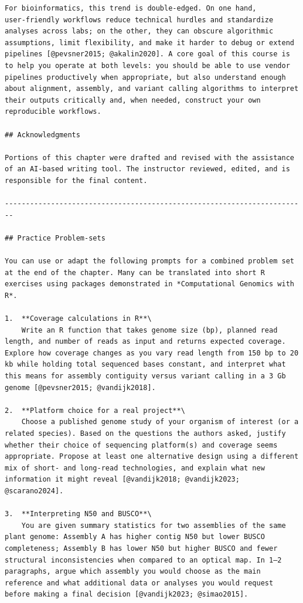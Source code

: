 \documentclass[
  letterpaper,
  DIV=11,
  numbers=noendperiod]{scrreprt}
\begin{document}
\begin{verbatim}
For bioinformatics, this trend is double‑edged. On one hand, user‑friendly workflows reduce technical hurdles and standardize analyses across labs; on the other, they can obscure algorithmic assumptions, limit flexibility, and make it harder to debug or extend pipelines [@pevsner2015; @akalin2020]. A core goal of this course is to help you operate at both levels: you should be able to use vendor pipelines productively when appropriate, but also understand enough about alignment, assembly, and variant calling algorithms to interpret their outputs critically and, when needed, construct your own reproducible workflows.

## Acknowledgments

Portions of this chapter were drafted and revised with the assistance of an AI‑based writing tool. The instructor reviewed, edited, and is responsible for the final content.

------------------------------------------------------------------------

## Practice Problem‑sets

You can use or adapt the following prompts for a combined problem set at the end of the chapter. Many can be translated into short R exercises using packages demonstrated in *Computational Genomics with R*.

1.  **Coverage calculations in R**\
    Write an R function that takes genome size (bp), planned read length, and number of reads as input and returns expected coverage. Explore how coverage changes as you vary read length from 150 bp to 20 kb while holding total sequenced bases constant, and interpret what this means for assembly contiguity versus variant calling in a 3 Gb genome [@pevsner2015; @vandijk2018].

2.  **Platform choice for a real project**\
    Choose a published genome study of your organism of interest (or a related species). Based on the questions the authors asked, justify whether their choice of sequencing platform(s) and coverage seems appropriate. Propose at least one alternative design using a different mix of short‑ and long‑read technologies, and explain what new information it might reveal [@vandijk2018; @vandijk2023; @scarano2024].

3.  **Interpreting N50 and BUSCO**\
    You are given summary statistics for two assemblies of the same plant genome: Assembly A has higher contig N50 but lower BUSCO completeness; Assembly B has lower N50 but higher BUSCO and fewer structural inconsistencies when compared to an optical map. In 1–2 paragraphs, argue which assembly you would choose as the main reference and what additional data or analyses you would request before making a final decision [@vandijk2023; @simao2015].


\end{verbatim}
\end{document}
